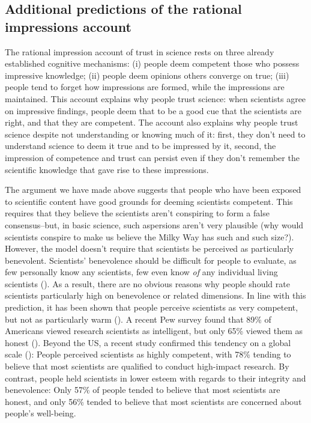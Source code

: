 \documentclass[
  jou,
  floatsintext,
  longtable,
  nolmodern,
  notxfonts,
  notimes,
  colorlinks=true,linkcolor=blue,citecolor=blue,urlcolor=blue]{apa7}
\begin{document}
\subsection{Additional predictions of the rational impressions
account}\label{additional-predictions-of-the-rational-impressions-account}

The rational impression account of trust in science rests on three
already established cognitive mechanisms: (i) people deem competent
those who possess impressive knowledge; (ii) people deem opinions others
converge on true; (iii) people tend to forget how impressions are
formed, while the impressions are maintained. This account explains why
people trust science: when scientists agree on impressive findings,
people deem that to be a good cue that the scientists are right, and
that they are competent. The account also explains why people trust
science despite not understanding or knowing much of it: first, they
don't need to understand science to deem it true and to be impressed by
it, second, the impression of competence and trust can persist even if
they don't remember the scientific knowledge that gave rise to these
impressions.

The argument we have made above suggests that people who have been
exposed to scientific content have good grounds for deeming scientists
competent. This requires that they believe the scientists aren't
conspiring to form a false consensus--but, in basic science, such
aspersions aren't very plausible (why would scientists conspire to make
us believe the Milky Way has such and such size?). However, the model
doesn't require that scientists be perceived as particularly benevolent.
Scientists' benevolence should be difficult for people to evaluate, as
few personally know any scientists, few even know \emph{of} any
individual living scientists
(). As a result, there are no obvious reasons why people should rate
scientists particularly high on benevolence or related dimensions. In
line with this prediction, it has been shown that people perceive
scientists as very competent, but not as particularly warm
(). A
recent Pew survey found that 89\% of Americans viewed research
scientists as intelligent, but only 65\% viewed them as honest
(). Beyond the US, a recent study confirmed this tendency on a
global scale (): People perceived scientists as highly competent, with 78\%
tending to believe that most scientists are qualified to conduct
high-impact research. By contrast, people held scientists in lower
esteem with regards to their integrity and benevolence: Only 57\% of
people tended to believe that most scientists are honest, and only 56\%
tended to believe that most scientists are concerned about people's
well-being.
\end{document}
